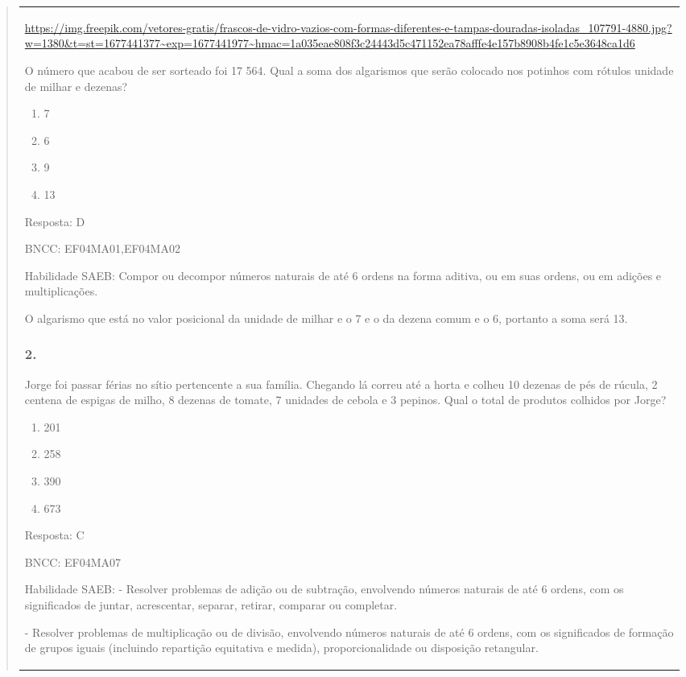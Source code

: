 \begin{enumerate}
\begin{escolha}
\begin{enumerate}
\begin{itemize}
\begin{itemize}
\begin{escolha}
\begin{quote}
\begin{escolha}
{\begin{longtable}[]{@{}l@{}}
\begin{itemize}
\url{https://img.freepik.com/vetores-gratis/frascos-de-vidro-vazios-com-formas-diferentes-e-tampas-douradas-isoladas_107791-4880.jpg?w=1380\&t=st=1677441377~exp=1677441977~hmac=1a035eae808f3c24443d5c471152ea78afffe4e157b8908b4fe1c5e3648ca1d6}

O número que acabou de ser sorteado foi 17 564. Qual a soma dos
algarismos que serão colocado nos potinhos com rótulos unidade de milhar
e dezenas?

\begin{enumerate}
\def\labelenumi{\alph{enumi})}
\item
  7
\item
  6
\item
  9
\item
  13
\end{enumerate}

Resposta: D

BNCC: EF04MA01,EF04MA02

Habilidade SAEB: Compor ou decompor números naturais de até 6 ordens na
forma aditiva, ou em suas ordens, ou em adições e multiplicações.

O algarismo que está no valor posicional da unidade de milhar e o 7 e o
da dezena comum e o 6, portanto a soma será 13.

\subsubsection{2. }\label{section-188}

Jorge foi passar férias no sítio pertencente a sua família. Chegando lá
correu até a horta e colheu 10 dezenas de pés de rúcula, 2 centena de
espigas de milho, 8 dezenas de tomate, 7 unidades de cebola e 3 pepinos.
Qual o total de produtos colhidos por Jorge?

\begin{enumerate}
\def\labelenumi{\alph{enumi})}
\item
  201
\item
  258
\item
  390
\item
  673
\end{enumerate}

Resposta: C

BNCC: EF04MA07

Habilidade SAEB: - Resolver problemas de adição ou de subtração,
envolvendo números naturais de até 6 ordens, com os significados de
juntar, acrescentar, separar, retirar, comparar ou completar.

- Resolver problemas de multiplicação ou de divisão, envolvendo números
naturais de até 6 ordens, com os significados de formação de grupos
iguais (incluindo repartição equitativa e medida), proporcionalidade ou
disposição retangular.


\end{itemize}
\end{longtable}}
\end{escolha}
\end{quote}
\end{escolha}
\end{itemize}
\end{itemize}
\end{enumerate}
\end{escolha}
\end{enumerate}
